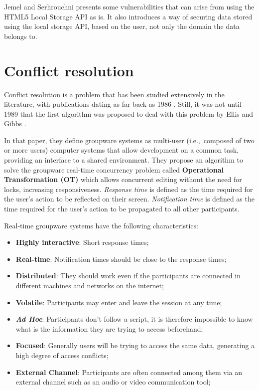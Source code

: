 Jemel and Serhrouchni \cite{Jemel2014} presents some vulnerabilities that can arise from using the HTML5 Local Storage API as is. It also introduces a way of securing data stored using the local storage API, based on the user, not only the domain the data belongs to.


\section{Conflict resolution}\label{sec:conflict-res-sota}

Conflict resolution is a problem that has been studied extensively in the literature, with publications dating as far back as 1986 \cite{Greif1986}. Still, it was not until 1989 that the first algorithm was proposed to deal with this problem by Ellis and Gibbs \cite{Ellis1989}.

In that paper, they define groupware systems as multi-user (i.e.,\ composed of two or more users) computer systems that allow development on a common task, providing an interface to a shared environment. They propose an algorithm to solve the groupware real-time concurrency problem called \textbf{Operational Transformation (OT)} which allows concurrent editing without the need for locks, increasing responsiveness. \textit{Response time} is defined as the time required for the user's action to be reflected on their screen. \textit{Notification time} is defined as the time required for the user's action to be propagated to all other participants.

Real-time groupware systems have the following characteristics:

\begin{itemize}
    \item \textbf{Highly interactive}: Short response times;
    \item \textbf{Real-time}: Notification times should be close to the response times;
    \item \textbf{Distributed}: They should work even if the participants are connected in different machines and networks on the internet;
    \item \textbf{Volatile}: Participants may enter and leave the session at any time;
    \item \textbf{\textit{Ad Hoc}}: Participants don't follow a script, it is therefore impossible to know what is the information they are trying to access beforehand;
    \item \textbf{Focused}: Generally users will be trying to access the same data, generating a high degree of access conflicts;
    \item \textbf{External Channel}: Participants are often connected among them via an external channel such as an audio or video communication tool;
\end{itemize}

